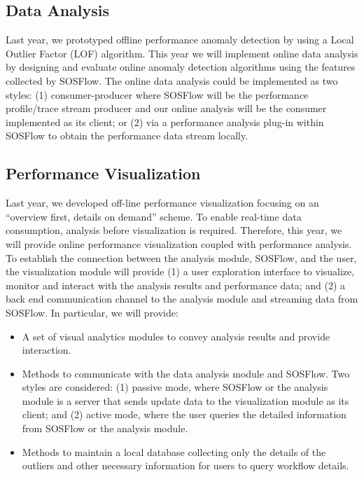 \subsection{Data Analysis}
Last year, we prototyped offline performance anomaly detection by using a Local Outlier Factor (LOF) algorithm. This year we will implement online data analysis by designing and evaluate online anomaly detection algorithms using the features collected by SOSFlow.  The online data analysis could be implemented as two styles: (1) consumer-producer where SOSFlow will be the performance profile/trace stream producer and our online analysis will be the consumer implemented as its client; or (2) via a performance analysis plug-in within SOSFlow to obtain the performance data stream locally.

\subsection{Performance Visualization}
Last year, we developed off-line performance visualization focusing on an ``overview first, details on demand'' scheme. To enable real-time data consumption, analysis before visualization is required.  Therefore, this year, we will provide online performance visualization coupled with performance analysis.  
To establish the connection between the analysis module, SOSFlow, and the user, the visualization module will provide (1) a user exploration interface to visualize, monitor and interact with the analysis results and performance data; and (2) a back end communication channel to the analysis module and streaming data from SOSFlow.   In particular,
we will provide:
\begin{itemize}
\item A set of visual analytics modules to convey analysis results and provide interaction.
\item Methods to communicate with the data analysis module and SOSFlow. Two styles are considered: (1) passive mode, where SOSFlow or the analysis module is a server that sends update data to the visualization module as its client; and (2) active mode, where the user queries the detailed information from SOSFlow or the analysis module. 
\item Methods to maintain a local database collecting only the details of the outliers and other necessary information for users to query workflow details.
\end{itemize}

